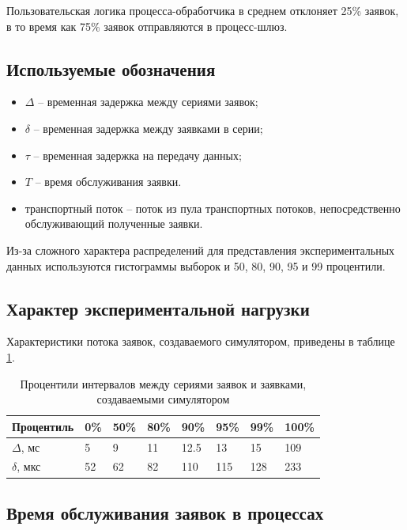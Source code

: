 Пользовательская логика процесса-обработчика в среднем отклоняет 25\% заявок, в то время как 75\% заявок отправляются в процесс-шлюз.

\subsection{Используемые обозначения}

\begin{itemize}
\item $\Delta$ -- временная задержка между сериями заявок;
\item $\delta$ -- временная задержка между заявками в серии;
\item $\tau$ -- временная задержка на передачу данных;
\item $T$ -- время обслуживания заявки.
\item транспортный поток -- поток из пула транспортных потоков, непосредственно обслуживающий полученные заявки.
\end{itemize}

Из-за сложного характера распределений для представления экспериментальных данных используются гистограммы выборок и 50, 80, 90, 95 и 99 процентили.

\subsection{Характер экспериментальной нагрузки}

Характеристики потока заявок, создаваемого симулятором, приведены в таблице \ref{chapter41:TableSimulator}.
\begin{table}[!h]
\caption{Процентили интервалов между сериями заявок и заявками, создаваемыми симулятором}\label{chapter41:TableSimulator}
\centering
\begin{tabular}{|l|l|l|l|l|l|l|l|}
\hline
Процентиль & 0\% & 50\% & 80\% & 90\% & 95\% & 99\% & 100\% \\ \hline
$\Delta$, мс & 5 & 9 & 11 & 12.5 & 13 & 15 & 109 \\ \hline
$\delta$, мкс & 52 & 62 & 82 & 110 & 115 & 128 & 233 \\ \hline
\end{tabular}
\end{table}

\subsection{Время обслуживания заявок в процессах}

